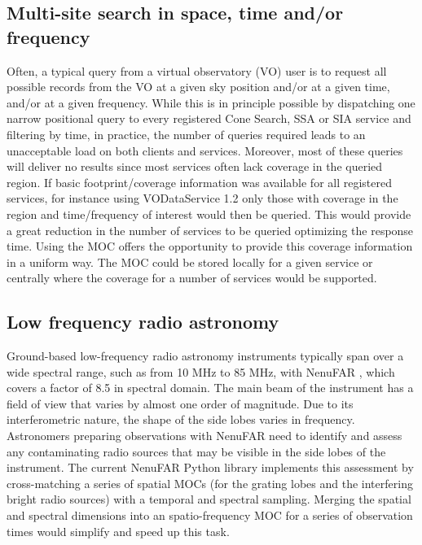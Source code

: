 \documentclass[11pt,a4paper]{ivoa}
\begin{document}
\subsection{Multi-site search in space, time and/or frequency}
Often, a typical query from a virtual observatory (VO) user is to
request all possible records from the VO at a given sky position
and/or at a given time, and/or at a given frequency.
While this is in principle possible by dispatching one narrow positional
query to every registered Cone Search, SSA or SIA service and filtering
by time, in practice, the number of queries required leads to an unacceptable
load on both clients and services. Moreover, most of these queries will
deliver no results since most services often lack coverage in the queried
region. If basic footprint/coverage information was available for all
registered services, for instance using VODataService 1.2
\citep{2021ivoa.spec.1102D} only those with coverage in the region
and time/frequency of interest would then be queried. This would provide a
great reduction in the number of services to be queried optimizing the
response time. Using the MOC offers the opportunity to provide this
coverage information in a uniform way. The MOC could be stored locally
for a given service or centrally where the coverage for a number of
services would be supported.

\subsection{Low frequency radio astronomy}

Ground-based low-frequency radio astronomy instruments typically span over
a wide spectral range, such as from 10 MHz to 85 MHz, with NenuFAR
\citep{zarka_2028}, which covers a factor of 8.5 in spectral domain.
The main beam of the instrument has a field of view that varies by almost one
order of magnitude. Due to its interferometric nature, the shape of the side
lobes varies in frequency.
Astronomers preparing observations with NenuFAR need to identify and assess
any contaminating radio sources that may be visible in the side lobes of
the instrument.
The current NenuFAR Python library \citep[nenupy,][]{loh_2025} implements this
assessment by cross-matching a series of spatial MOCs (for the grating lobes
and the interfering bright radio sources) with a temporal and spectral sampling.
Merging the spatial and spectral dimensions into an spatio-frequency MOC
for a series of observation times would simplify and speed up this task.
\end{document}
